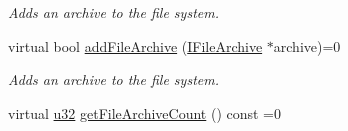 \begin{DoxyCompactItemize}
\begin{DoxyCompactList}\small\item\em Adds an archive to the file system. \end{DoxyCompactList}\item 
virtual bool \hyperlink{classirr_1_1io_1_1IFileSystem_aedecc2c6f4c567de8bbe54fd711f7143}{add\+File\+Archive} (\hyperlink{classirr_1_1io_1_1IFileArchive}{I\+File\+Archive} $\ast$archive)=0
\begin{DoxyCompactList}\small\item\em Adds an archive to the file system. \end{DoxyCompactList}\item 
virtual \hyperlink{namespaceirr_a0416a53257075833e7002efd0a18e804}{u32} \hyperlink{classirr_1_1io_1_1IFileSystem_a15ecdb3ac4fd3d564a7fd976bab9acd6}{get\+File\+Archive\+Count} () const  =0\hypertarget{classirr_1_1io_1_1IFileSystem_a15ecdb3ac4fd3d564a7fd976bab9acd6}{}\label{classirr_1_1io_1_1IFileSystem_a15ecdb3ac4fd3d564a7fd976bab9acd6}


\end{DoxyCompactItemize}
